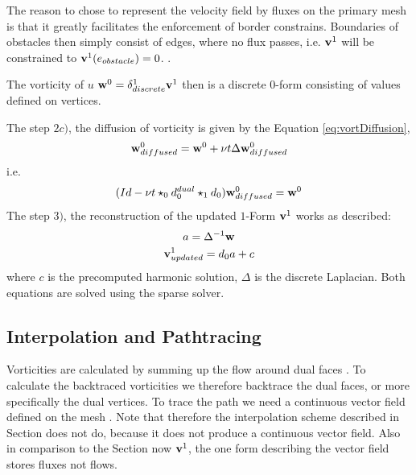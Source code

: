 The reason to chose to represent the velocity field by fluxes on the primary mesh is that it greatly facilitates the enforcement of border constrains. Boundaries of obstacles then simply consist of edges, where no flux passes, i.e. $\textbf{v}^1$ will be constrained to $\textbf{v}^1(e_{obstacle}) = 0$. .

The vorticity of $u$ $ \textbf{w}^0 = \delta_{discrete}^1 \textbf{v}^{1}$ then is  a discrete $0$-form consisting of values defined on vertices.

The step $2 c)$, the diffusion of vorticity is given by the Equation \ref{eq:vortDiffusion},
\[\textbf{w}^0_{diffused} = \textbf{w}^0 + \nu t \Delta \textbf{w}^0_{diffused}\]
i.e.
\[(Id - \nu t  \star_0 d^{dual}_0\star_1d_0)\textbf{w}^0_{diffused} = \textbf{w}^0\] 
The step $3)$, the reconstruction of the updated $1$-Form $\textbf{v}^1$ works as described:
\[a = \Delta^{-1} \textbf{w}\]
\[\textbf{v}^1_{updated} =  d_0a + c\]
where $c$ is the precomputed harmonic solution, $\Delta$ is the discrete Laplacian. Both equations are solved using the sparse solver.


\subsection{Interpolation and Pathtracing}
Vorticities are calculated by summing up the flow around dual faces . To calculate the backtraced vorticities we therefore backtrace the dual faces, or more specifically the dual vertices. To trace the path we need a continuous vector field defined on the mesh . Note that therefore the interpolation scheme described in Section  does not do, because it does not produce a continuous vector field. Also in comparison to the Section  now $\textbf{v}^1$, the one form describing the vector field stores fluxes not flows.

